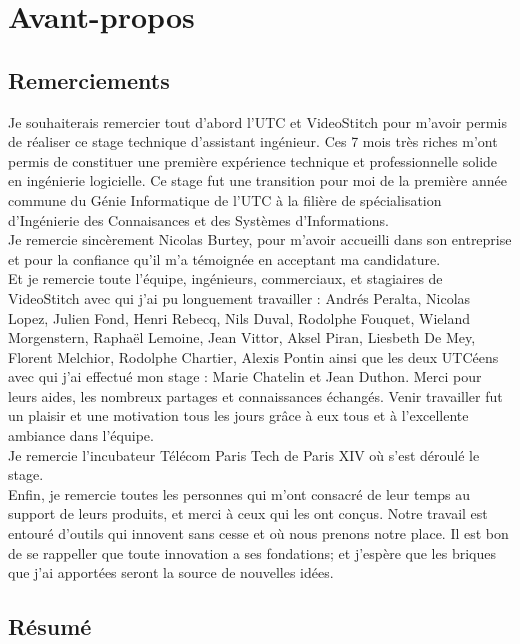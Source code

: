 \chapter*{Avant-propos}

\section*{Remerciements}
Je souhaiterais remercier tout d'abord l'UTC et VideoStitch pour m'avoir permis de réaliser ce stage technique d'assistant ingénieur. Ces 7 mois très riches m'ont permis de constituer une première expérience technique et professionnelle solide en ingénierie logicielle. Ce stage fut une transition pour moi de la première année commune du Génie Informatique de l'UTC à la filière de spécialisation d'Ingénierie des Connaisances et des Systèmes d'Informations.
\\
\newline
Je remercie sincèrement Nicolas Burtey, pour m'avoir accueilli dans son entreprise et pour la confiance qu'il m'a témoignée en acceptant ma candidature.\\
Et je remercie toute l'équipe, ingénieurs, commerciaux, et stagiaires de VideoStitch avec qui j'ai pu longuement travailler : Andrés Peralta, Nicolas Lopez, Julien Fond, Henri Rebecq, Nils Duval, Rodolphe Fouquet, Wieland Morgenstern, Raphaël Lemoine, Jean Vittor, Aksel Piran, Liesbeth De Mey, Florent Melchior, Rodolphe Chartier, Alexis Pontin ainsi que les deux UTCéens avec qui j'ai effectué mon stage : Marie Chatelin et Jean Duthon. Merci pour leurs aides, les nombreux partages et connaissances échangés. Venir travailler fut un plaisir et une motivation tous les jours grâce à eux tous et à l'excellente ambiance dans l'équipe.
\\
\newline
Je remercie l'incubateur Télécom Paris Tech de Paris XIV où s'est déroulé le stage.
\\
\newline
Enfin, je remercie toutes les personnes qui m'ont consacré de leur temps au support de leurs produits, et merci à ceux qui les ont conçus. Notre travail est entouré d'outils qui innovent sans cesse et où nous prenons notre place. Il est bon de se rappeller que toute innovation a ses fondations; et j'espère que les briques que j'ai apportées seront la source de nouvelles idées.


\section*{Résumé}
\begin{abstract}
...
\end{abstract}
